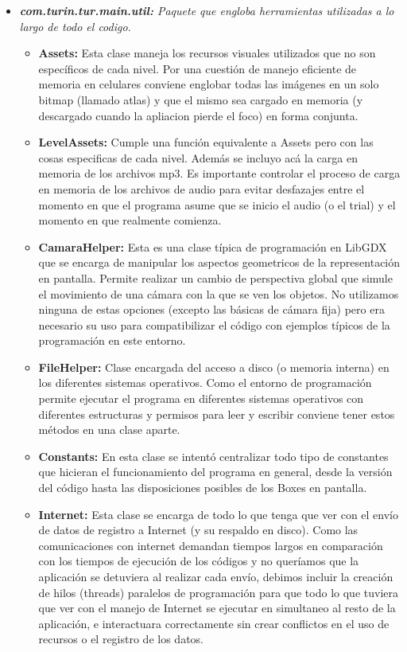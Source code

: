 \documentclass{article}
\begin{document}
\begin{itemize}
        \item \textit{\textbf{com.turin.tur.main.util:} Paquete que engloba herramientas utilizadas a lo largo de todo el codigo.}
        \begin{itemize}
            \item \textbf{Assets:} Esta clase maneja los recursos visuales utilizados que no son específicos de cada nivel. Por una cuestión de manejo eficiente de memoria en celulares conviene englobar todas las imágenes en un solo bitmap (llamado atlas) y que el mismo sea cargado en memoria (y descargado cuando la apliacion pierde el foco) en forma conjunta.
            \item \textbf{LevelAssets:} Cumple una función equivalente a Assets pero con las cosas especificas de cada nivel. Además se incluyo acá la carga en memoria de los archivos mp3. Es importante controlar el proceso de carga en memoria de los archivos de audio para evitar desfazajes entre el momento en que el programa asume que se inicio el audio (o el trial) y el momento en que realmente comienza.
            \item \textbf{CamaraHelper:} Esta es una clase típica de programación en LibGDX que se encarga de manipular los aspectos geometricos de la representación en pantalla. Permite realizar un cambio de perspectiva global que simule el movimiento de una cámara con la que se ven los objetos. No utilizamos ninguna de estas opciones (excepto las básicas de cámara fija) pero era necesario su uso para compatibilizar el código con ejemplos típicos de la programación en este entorno.
            \item \textbf{FileHelper:} Clase encargada del acceso a disco (o memoria interna) en los diferentes sistemas operativos. Como el entorno de programación permite ejecutar el programa en diferentes sistemas operativos con diferentes estructuras y permisos para leer y escribir conviene tener estos métodos en una clase aparte. 
            \item \textbf{Constants:} En esta clase se intentó centralizar todo tipo de constantes que hicieran el funcionamiento del programa en general, desde la versión del código hasta las disposiciones posibles de los Boxes en pantalla. 
            \item \textbf{Internet:} Esta clase se encarga de todo lo que tenga que ver con el envío de datos de registro a Internet (y su respaldo en disco). Como las comunicaciones con internet demandan tiempos largos en comparación con los tiempos de ejecución de los códigos y no queríamos que la aplicación se detuviera al realizar cada envío, debimos incluir la creación de hilos (threads) paralelos de programación para que todo lo que tuviera que ver con el manejo de Internet se ejecutar en simultaneo al resto de la aplicación, e interactuara correctamente sin crear conflictos en el uso de recursos o el registro de los datos.
        \end{itemize}
        

\end{itemize}
\end{document}
